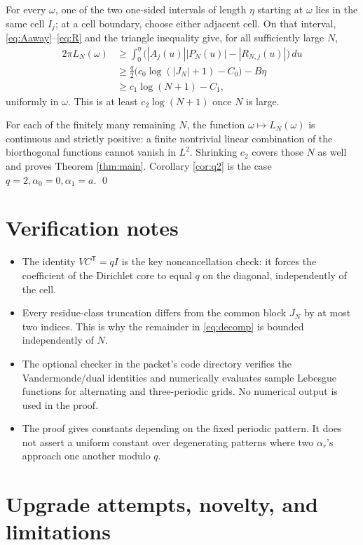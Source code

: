 \documentclass[11pt]{article}
\begin{document}
For every \(\omega\), one of the two one-sided intervals of length \(\eta\)
starting at \(\omega\) lies in the same cell \(I_j\); at a cell boundary,
choose either adjacent cell.  On that interval, \eqref{eq:Aaway}--\eqref{eq:R}
and the triangle inequality give, for all sufficiently large \(N\),
\begin{align*}
 2\pi L_N(\omega)
 &\geq \int_0^\eta
 \bigl(|A_j(u)||P_N(u)|-|R_{N,j}(u)|\bigr)\,du\\
 &\geq \frac q2\bigl(c_0\log(|J_N|+1)-C_0\bigr)-B\eta\\
 &\geq c_1\log(N+1)-C_1,
\end{align*}
uniformly in \(\omega\).  This is at least \(c_2\log(N+1)\) once \(N\)
is large.

For each of the finitely many remaining \(N\), the function
\(\omega\mapsto L_N(\omega)\) is continuous and strictly positive: a
finite nontrivial linear combination of the biorthogonal functions cannot
vanish in \(L^2\).  Shrinking \(c_2\) covers those \(N\) as well and proves
Theorem \ref{thm:main}.  Corollary \ref{cor:q2} is the case
\(q=2,\alpha_0=0,\alpha_1=a\).
\qed

\section*{Verification notes}

\begin{itemize}
\item The identity \(VC^{\mathsf T}=qI\) is the key noncancellation check:
      it forces the coefficient of the Dirichlet core to equal \(q\) on
      the diagonal, independently of the cell.
\item Every residue-class truncation differs from the common block \(J_N\)
      by at most two indices.  This is why the remainder in
      \eqref{eq:decomp} is bounded independently of \(N\).
\item The optional checker in the packet's code directory verifies the
      Vandermonde/dual identities and numerically evaluates sample Lebesgue
      functions for alternating and three-periodic grids.  No numerical
      output is used in the proof.
\item The proof gives constants depending on the fixed periodic pattern.
      It does not assert a uniform constant over degenerating patterns
      where two \(\alpha_r\)'s approach one another modulo \(q\).
\end{itemize}

\section*{Upgrade attempts, novelty, and limitations}
\end{document}
